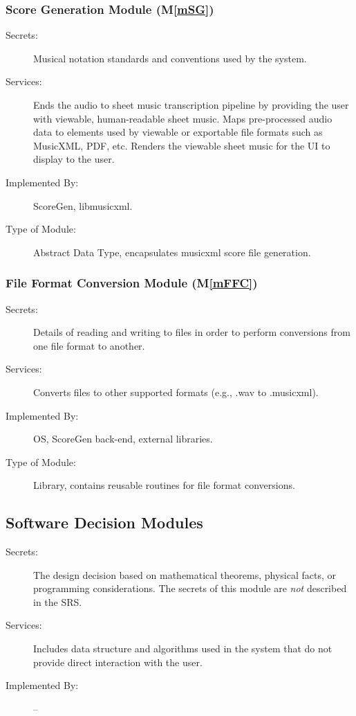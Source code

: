 \documentclass[12pt, titlepage]{article}
\newcommand{\mref}[1]{M\ref{#1}}
\begin{document}
\subsubsection{Score Generation Module (\mref{mSG})}

\begin{description}
\item[Secrets:] Musical notation standards and conventions used by the system.
\item[Services:] Ends the audio to sheet music transcription pipeline by providing the user with viewable, human-readable sheet music.
  Maps pre-processed audio data to elements used by viewable or exportable file formats such as MusicXML, PDF, etc.
  Renders the viewable sheet music for the UI to display to the user.
\item[Implemented By:] ScoreGen, libmusicxml.
\item[Type of Module:] Abstract Data Type, encapsulates musicxml score file generation.
\end{description}

\subsubsection{File Format Conversion Module (\mref{mFFC})}

\begin{description}
\item[Secrets:] Details of reading and writing to files in order to perform conversions from one file format to another.
\item[Services:] Converts files to other supported formats (e.g., .wav to .musicxml).
\item[Implemented By:] OS, ScoreGen back-end, external libraries.
\item[Type of Module:] Library, contains reusable routines for file format conversions.
\end{description}

\subsection{Software Decision Modules}

\begin{description}
\item[Secrets:] The design decision based on mathematical theorems, physical
  facts, or programming considerations. The secrets of this module are
  \emph{not} described in the SRS.
\item[Services:] Includes data structure and algorithms used in the system that
  do not provide direct interaction with the user. 
\item[Implemented By:] --
\end{description}
\end{document}
